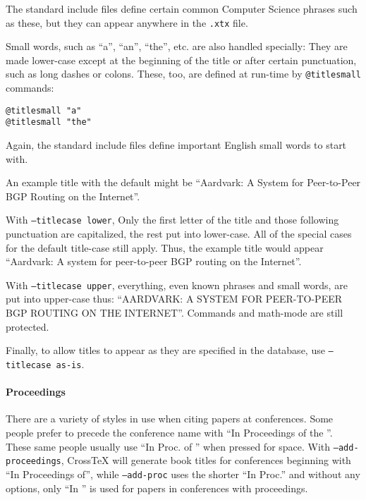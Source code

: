 \documentclass{article}
\newcommand{\XTeX}{Cross\TeX}
\begin{document}
The standard include files define certain common Computer Science phrases such as these, but they can appear anywhere in the \texttt{.xtx} file.

Small words, such as ``a'', ``an'', ``the'', etc. are also handled specially: They are made lower-case except at the beginning of the title or after certain punctuation, such as long dashes or colons.  These, too, are defined at run-time by \texttt{@titlesmall} commands:

\begin{small}\begin{verbatim}
@titlesmall "a"
@titlesmall "the"
\end{verbatim}\end{small}

Again, the standard include files define important English small words to start with.

An example title with the default might be ``Aardvark: A System for Peer-to-Peer BGP Routing on the Internet''.

With \texttt{--titlecase lower}, Only the first letter of the title and those following punctuation are capitalized, the rest put into lower-case.  All of the special cases for the default title-case still apply.  Thus, the example title would appear ``Aardvark: A system for peer-to-peer BGP routing on the Internet''.

With \texttt{--titlecase upper}, everything, even known phrases and small words, are put into upper-case thus: ``AARDVARK: A SYSTEM FOR PEER-TO-PEER BGP ROUTING ON THE INTERNET''.  Commands and math-mode are still protected.

Finally, to allow titles to appear as they are specified in the database, use \texttt{--titlecase as-is}.

\paragraph{Proceedings}

There are a variety of styles in use when citing papers at conferences. Some
people prefer to precede the conference name with ``In Proceedings of the ''. 
These same people usually use ``In Proc. of '' when pressed for space.
With \texttt{--add-proceedings}, \XTeX{}
will generate book titles for conferences beginning with ``In
Proceedings of'', while \texttt{--add-proc} uses the shorter ``In
Proc.'' and without any options, only ``In '' is used for papers
in conferences with proceedings. 
\end{document}
